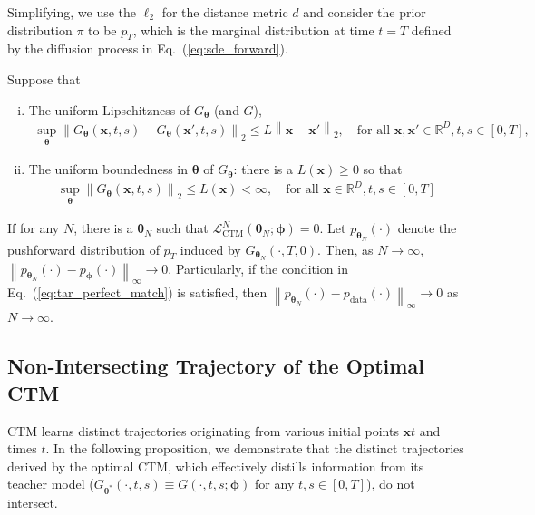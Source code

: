 \documentclass{article} \usepackage{iclr2024_coNFErence,times}
\def\eqref#1{equation~\ref{#1}}
\newcommand{\norm}[1]{\left\lVert#1\right\rVert}
\def\eqref#1{(\ref{#1})}
\def\eqref#1{(\ref{#1})}
\theoremstyle{definition}
\theoremstyle{remark}
\begin{document}
Simplifying, we use the $\ell_2$ for the distance metric $d$ and consider the prior distribution $\pi$ to be $p_T$, which is the marginal distribution at time $t=T$ defined by the diffusion process in Eq.~\eqref{eq:sde_forward}.



\begin{proposition}\label{th:density_match}  Suppose that 
\begin{enumerate}[(i)]
        \item 
    The uniform Lipschitzness of $G_{\bm{\theta}}$ (and $G$),
    \begin{align*}
        \sup_{\bm{\theta}}\norm{G_{\bm{\theta}}(\mathbf{x}, t, s) - G_{\bm{\theta}}(\mathbf{x}', t, s)}_2 \leq L \norm{\mathbf{x} - \mathbf{x}'}_2, \quad \text{for all } \mathbf{x}, \mathbf{x}'\in \mathbb{R}^D, t, s\in[0,T], 
    \end{align*}
    \item The uniform boundedness in $\bm{\theta}$ of $G_{\bm{\theta}}$: there is a $L(\mathbf{x}
    )\geq0$ so that
    \begin{align*}
   \sup_{\bm{\theta}} \norm{G_{\bm{\theta}}(\mathbf{x}, t, s) }_2 \leq L(\mathbf{x}
    )<\infty, \quad \text{for all } \mathbf{x} \in \mathbb{R}^D, t, s\in[0,T]
    \end{align*}
\end{enumerate}
If for any $N$, there is a $\bm{\theta}_N$ such that $\mathcal{L}_{\text{CTM}}^{N}(\bm{\theta}_N;\bm{\phi})=0$. Let $p_{ \bm{\theta}_N}(\cdot)$ denote the pushforward distribution of $p_T$ induced by $G_{\bm{\theta}_N}(\cdot, T, 0)$. Then, as $N\rightarrow\infty$, $\norm{p_{ \bm{\theta}_N}(\cdot)- p_{\bm{\phi}}(\cdot)}_{\infty}\rightarrow 0$. Particularly, if the condition in Eq.~\eqref{eq:tar_perfect_match} is satisfied, then $\norm{p_{\bm{\theta}_N}(\cdot)- p_{\text{data}}(\cdot)}_{{\infty}}\rightarrow 0$ as $N\rightarrow\infty$.
\end{proposition}


\subsection{Non-Intersecting Trajectory of the Optimal CTM}\label{sec:non_intersect}
CTM learns distinct trajectories originating from various initial points $\mathbf{x}t$ and times $t$. In the following proposition, we demonstrate that the distinct trajectories derived by the optimal CTM, which effectively distills information from its teacher model ($G_{\bm{\theta}^*}(\cdot,t,s)\equiv G(\cdot,t,s;\bm{\phi})$ for any $t, s\in[0,T]$), do not intersect.
\end{document}

